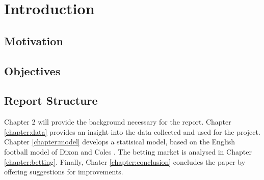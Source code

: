 \chapter{Introduction}

\section{Motivation}

\section{Objectives}

\section{Report Structure}
Chapter 2 will provide the background necessary for the report.  Chapter \ref{chapter:data} provides an insight into the data collected and used for the project.  Chapter \ref{chapter:model} develops a statisical model, based on the English football model of Dixon and Coles \citep{dixon_coles}.  The betting market is analysed in Chapter \ref{chapter:betting}.  Finally, Chater \ref{chapter:conclusion} concludes the paper by offering suggestions for improvements.